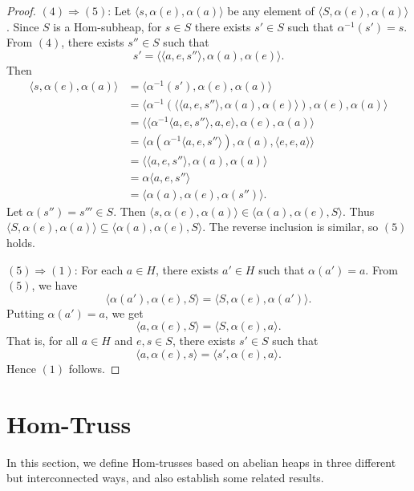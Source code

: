 \documentclass[14pt]{article}
\theoremstyle{Definition}
\theoremstyle{remark}
\begin{document}
\begin{proof}
\vspace{0.3em}
$(4) \Rightarrow (5)$:  
Let $\langle s, \alpha(e), \alpha(a) \rangle$ be any element of $\langle S, \alpha(e), \alpha(a) \rangle$.  
Since $S$ is a Hom-subheap, for $s \in S$ there exists $s' \in S$ such that $\alpha^{-1}(s') = s$.  
From $(4)$, there exists $s'' \in S$ such that
\[
s' = \langle \langle a, e, s'' \rangle, \alpha(a), \alpha(e) \rangle.
\]
Then
\begin{align*}
\langle s, \alpha(e), \alpha(a) \rangle
&= \langle \alpha^{-1}(s'), \alpha(e), \alpha(a) \rangle \\
&= \langle \alpha^{-1}(\langle \langle a, e, s'' \rangle, \alpha(a), \alpha(e) \rangle), \alpha(e), \alpha(a) \rangle \\
&= \langle \langle \alpha^{-1} \langle a, e, s'' \rangle, a, e \rangle, \alpha(e), \alpha(a) \rangle \\
&= \langle \alpha(\alpha^{-1} \langle a, e, s'' \rangle), \alpha(a), \langle e, e, a \rangle \rangle \\
&= \langle \langle a, e, s'' \rangle, \alpha(a), \alpha(a) \rangle \\
&= \alpha \langle a, e, s'' \rangle \\
&= \langle \alpha(a),\alpha(e), \alpha(s'') \rangle.
\end{align*}
Let $\alpha(s'') = s''' \in S$. Then $\langle s, \alpha(e), \alpha(a) \rangle \in \langle \alpha(a), \alpha(e), S \rangle$.  
Thus $\langle S, \alpha(e), \alpha(a) \rangle \subseteq \langle \alpha(a), \alpha(e), S \rangle$.  
The reverse inclusion is similar, so $(5)$ holds.

\vspace{0.3em}
$(5) \Rightarrow (1)$:  
For each $a \in H$, there exists $a' \in H$ such that $\alpha(a') = a$.  
From $(5)$, we have
\[
\langle \alpha(a'), \alpha(e), S \rangle = \langle S, \alpha(e), \alpha(a') \rangle.
\]
Putting $\alpha(a') = a$, we get
\[
\langle a, \alpha(e), S \rangle = \langle S, \alpha(e), a \rangle.
\]
That is, for all $a \in H$ and $e, s \in S$, there exists $s' \in S$ such that
\[
\langle a, \alpha(e), s \rangle = \langle s', \alpha(e), a \rangle.
\]
Hence $(1)$ follows.
\end{proof}

\section{Hom-Truss}
In this section, we define Hom-trusses based on abelian heaps in three different but interconnected ways, and also establish some related results.  
\end{document}
